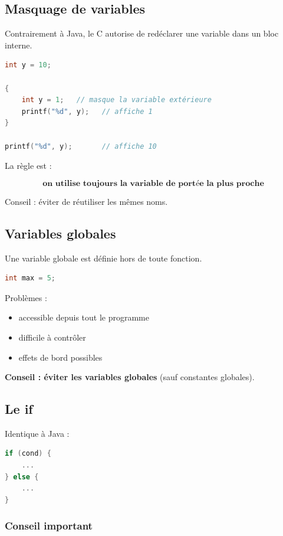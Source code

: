 \subsection{Masquage de variables}

Contrairement à Java, le C autorise de redéclarer une variable dans un bloc interne.

\begin{lstlisting}[language=C]
int y = 10;

{
    int y = 1;   // masque la variable extérieure
    printf("%d", y);   // affiche 1
}

printf("%d", y);       // affiche 10
\end{lstlisting}

La règle est :

\[
\textbf{on utilise toujours la variable de portée la plus proche}
\]

Conseil : éviter de réutiliser les mêmes noms.

\subsection{Variables globales}

Une variable globale est définie hors de toute fonction.

\begin{lstlisting}[language=C]
int max = 5;
\end{lstlisting}

Problèmes :

\begin{itemize}
    \item accessible depuis tout le programme
    \item difficile à contrôler
    \item effets de bord possibles
\end{itemize}

\textbf{Conseil : éviter les variables globales}
(sauf constantes globales).

\subsection{Le if}

Identique à Java :

\begin{lstlisting}[language=C]
if (cond) {
    ...
} else {
    ...
}
\end{lstlisting}

\subsubsection{Conseil important}

